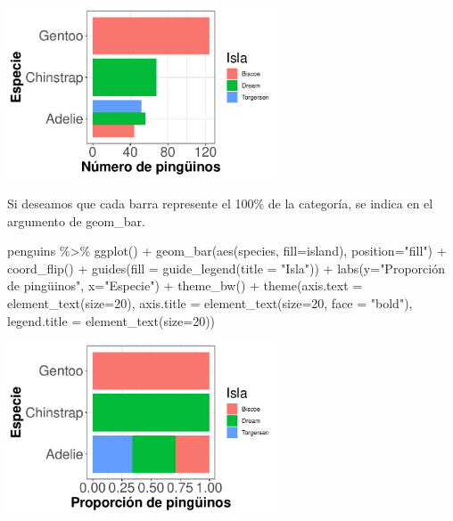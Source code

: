 \documentclass[
  letterpaper,
  DIV=11,
  numbers=noendperiod]{scrreprt}
\newenvironment{Shaded}{\begin{snugshade}}{\end{snugshade}}
\newcommand{\AttributeTok}[1]{\textcolor[rgb]{0.40,0.45,0.13}{#1}}
\newcommand{\DecValTok}[1]{\textcolor[rgb]{0.68,0.00,0.00}{#1}}
\newcommand{\FunctionTok}[1]{\textcolor[rgb]{0.28,0.35,0.67}{#1}}
\newcommand{\NormalTok}[1]{\textcolor[rgb]{0.00,0.23,0.31}{#1}}
\newcommand{\SpecialCharTok}[1]{\textcolor[rgb]{0.37,0.37,0.37}{#1}}
\newcommand{\StringTok}[1]{\textcolor[rgb]{0.13,0.47,0.30}{#1}}
\begin{document}
\begin{center}
\includegraphics[width=0.6\textwidth,height=0.6\textheight]{t1_intro_files/figure-pdf/unnamed-chunk-94-1.pdf}
\end{center}

Si deseamos que cada barra represente el 100\% de la categoría, se
indica en el argumento de geom\_bar.

\begin{Shaded}
\begin{Highlighting}[]
\NormalTok{penguins }\SpecialCharTok{\%\textgreater{}\%} \FunctionTok{ggplot}\NormalTok{() }\SpecialCharTok{+} 
  \FunctionTok{geom\_bar}\NormalTok{(}\FunctionTok{aes}\NormalTok{(species, }\AttributeTok{fill=}\NormalTok{island),}
           \AttributeTok{position=}\StringTok{"fill"}\NormalTok{) }\SpecialCharTok{+} \FunctionTok{coord\_flip}\NormalTok{() }\SpecialCharTok{+}
  \FunctionTok{guides}\NormalTok{(}\AttributeTok{fill =} \FunctionTok{guide\_legend}\NormalTok{(}\AttributeTok{title =} \StringTok{"Isla"}\NormalTok{)) }\SpecialCharTok{+}
  \FunctionTok{labs}\NormalTok{(}\AttributeTok{y=}\StringTok{"Proporción de pingüinos"}\NormalTok{, }\AttributeTok{x=}\StringTok{"Especie"}\NormalTok{) }\SpecialCharTok{+}
  \FunctionTok{theme\_bw}\NormalTok{() }\SpecialCharTok{+}
  \FunctionTok{theme}\NormalTok{(}\AttributeTok{axis.text =} \FunctionTok{element\_text}\NormalTok{(}\AttributeTok{size=}\DecValTok{20}\NormalTok{),}
        \AttributeTok{axis.title =} \FunctionTok{element\_text}\NormalTok{(}\AttributeTok{size=}\DecValTok{20}\NormalTok{, }\AttributeTok{face =} \StringTok{"bold"}\NormalTok{),}
        \AttributeTok{legend.title =} \FunctionTok{element\_text}\NormalTok{(}\AttributeTok{size=}\DecValTok{20}\NormalTok{))}
\end{Highlighting}
\end{Shaded}

\begin{center}
\includegraphics[width=0.6\textwidth,height=0.6\textheight]{t1_intro_files/figure-pdf/unnamed-chunk-95-1.pdf}
\end{center}
\end{document}

